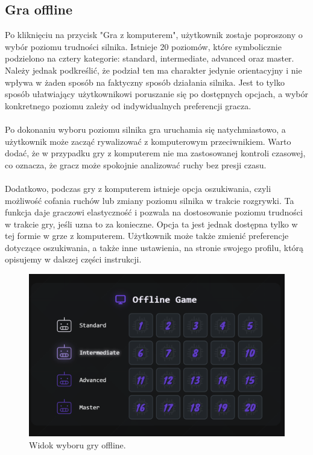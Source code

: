 \documentclass[12pt,a4paper]{article}
\begin{document}
\newpage
\subsection{Gra offline}
Po kliknięciu na przycisk "Gra z komputerem", użytkownik zostaje poproszony o wybór poziomu trudności silnika. Istnieje 20 poziomów, które symbolicznie podzielono na cztery kategorie: standard, intermediate, advanced oraz master. Należy jednak podkreślić, że podział ten ma charakter jedynie orientacyjny i nie wpływa w żaden sposób na faktyczny sposób działania silnika. Jest to tylko sposób ułatwiający użytkownikowi poruszanie się po dostępnych opcjach, a wybór konkretnego poziomu zależy od indywidualnych preferencji gracza.
\\\\
Po dokonaniu wyboru poziomu silnika gra uruchamia się natychmiastowo, a użytkownik może zacząć rywalizować z komputerowym przeciwnikiem. Warto dodać, że w przypadku gry z komputerem nie ma zastosowanej kontroli czasowej, co oznacza, że gracz może spokojnie analizować ruchy bez presji czasu.
\\\\
Dodatkowo, podczas gry z komputerem istnieje opcja oszukiwania, czyli możliwość cofania ruchów lub zmiany poziomu silnika w trakcie rozgrywki. Ta funkcja daje graczowi elastyczność i pozwala na dostosowanie poziomu trudności w trakcie gry, jeśli uzna to za konieczne. Opcja ta jest jednak dostępna tylko w tej formie w grze z komputerem. Użytkownik może także zmienić preferencje dotyczące oszukiwania, a także inne ustawienia, na stronie swojego profilu, którą opisujemy w dalszej części instrukcji.

\begin{figure}[h!]
    \centering
    \includegraphics[width=1\textwidth]{zdj/ins_min_pvc.png}
    \caption{Widok wyboru gry offline.}
\end{figure}
\end{document}
